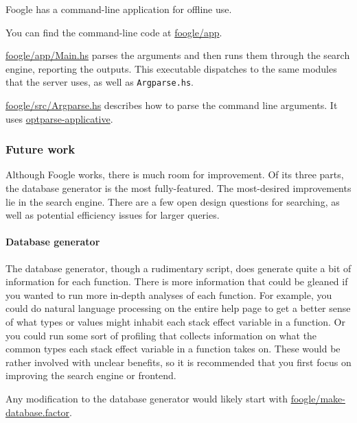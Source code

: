 \documentclass[
]{article}
\begin{document}
Foogle has a command-line application for offline use.

You can find the command-line code at
\href{https://github.com/factor-hmc/foogle/blob/master/app}{foogle/app}.

\href{https://github.com/factor-hmc/foogle/blob/master/app/Main.hs}{foogle/app/Main.hs}
parses the arguments and then runs them through the search engine,
reporting the outputs. This executable dispatches to the same modules
that the server uses, as well as \texttt{Argparse.hs}.

\href{https://github.com/factor-hmc/foogle/blob/master/src/Argparse.hs}{foogle/src/Argparse.hs}
describes how to parse the command line arguments. It uses
\href{https://hackage.haskell.org/package/optparse-applicative}{optparse-applicative}.

\hypertarget{future-work-1}{%
\subsubsection{Future work}\label{future-work-1}}

Although Foogle works, there is much room for improvement. Of its three
parts, the database generator is the most fully-featured. The
most-desired improvements lie in the search engine. There are a few open
design questions for searching, as well as potential efficiency issues
for larger queries.

\hypertarget{database-generator-1}{%
\paragraph{Database generator}\label{database-generator-1}}

The database generator, though a rudimentary script, does generate quite
a bit of information for each function. There is more information that
could be gleaned if you wanted to run more in-depth analyses of each
function. For example, you could do natural language processing on the
entire help page to get a better sense of what types or values might
inhabit each stack effect variable in a function. Or you could run some
sort of profiling that collects information on what the common types
each stack effect variable in a function takes on. These would be rather
involved with unclear benefits, so it is recommended that you first
focus on improving the search engine or frontend.

Any modification to the database generator would likely start with
\href{https://github.com/factor-hmc/foogle/blob/master/make-database.factor}{foogle/make-database.factor}.
\end{document}
